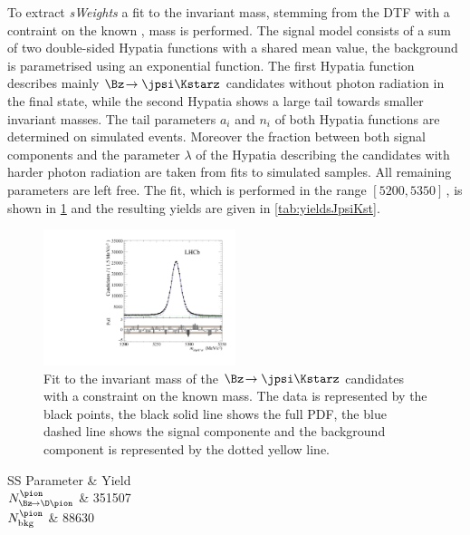 To extract \emph{sWeights} a fit to the invariant \Bz mass, stemming from the DTF with a contraint on the known \jpsi, mass is performed.
The signal model consists of a sum of two double-sided Hypatia functions with a shared mean value, the background is parametrised using an exponential function.
The first Hypatia function describes mainly $\Bz\!\to\jpsi\Kstarz$ candidates without photon radiation in the final state, while the second Hypatia shows a large tail towards smaller invariant masses.
The tail parameters $a_i$ and $n_i$ of both Hypatia functions are determined on simulated events.
Moreover the fraction between both signal components and the parameter $\lambda$ of the Hypatia describing the \Bz candidates with harder photon radiation are taken from fits to simulated samples.
All remaining parameters are left free.
The fit, which is performed in the range $[5200, 5350]\,$\si[per-mode=symbol]{\MeVcc}, is shown in \cref{fig:massFitJpsiKst} and the resulting yields are given in \cref{tab:yieldsJpsiKst}.
\begin{figure}[tbp]
    \centering
    \includegraphics[width=0.5\textwidth]{08FlavourTagging/figs/BmassJpsiKst_pull.pdf}
    \caption{Fit to the invariant mass of the $\Bz\!\to\jpsi\Kstarz$ candidates with a constraint on the known \jpsi mass.
    The data is represented by the black points, the black solid line shows the full PDF, the blue dashed line shows the signal componente and the background component is represented by the dotted yellow line.}
    \label{fig:massFitJpsiKst}
\end{figure}
\begin{table}[tbp]
	\centering
	\caption{Fitted Yields of the $\Bz\!\to\jpsi\Kstarz$ component and the combinatorial background.}
	\begin{tabular}{SS}
		\toprule
		{Parameter} & {Yield} \\
		\midrule
		{$N_{\Bz\!\to\D\pion}^{\pion}$}	& 351507 \\
		{$N_{\text{bkg}}^{\pion}$}		& 88630 \\
		\bottomrule
	\end{tabular}
	\label{tab:yieldsJpsiKst}
\end{table}

